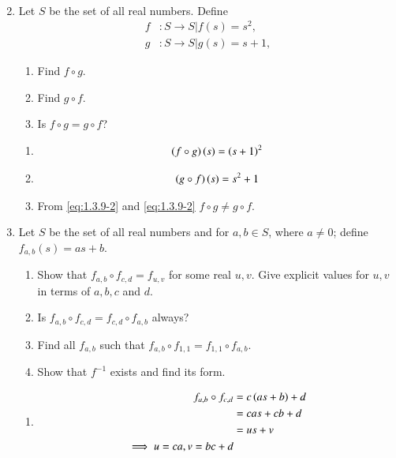 \begin{enumerate}[label=\arabic*.,ref=\thesubsection.\theenumi]
\begin{enumerate}
\begin{align}
	\end{align}
\end{enumerate}
\item Let $S$ be the set of all real numbers.  Define 
	\begin{align}
		f&:S \rightarrow S | f(s) = s^2,
		\\
		g&:S \rightarrow S | g(s) = s+1,
	\end{align}
\begin{enumerate}
	\item Find $f \circ g$.
	\item Find $g \circ f$.
	\item Is $f \circ g=g \circ f$?
\end{enumerate}
\solution 
\begin{enumerate}
	\item 
	\begin{align}
		\label{eq:1.3.9-1}
		\left(f \circ g\right)(s) = \left(s+1\right)^2
	\end{align}
	\item 
	\begin{align}
		\label{eq:1.3.9-2}
		\left(g \circ f\right)(s) = s^2+1
	\end{align}
	\item From 
		\eqref{eq:1.3.9-2}
		and
		\eqref{eq:1.3.9-2}
$f \circ g \ne g \circ f$.
\end{enumerate}
\item Let $S$ be the set of all real numbers and for $a, b \in S$, where $a \ne 0$; define $f_{a,b}(s) = as + b$.
\begin{enumerate}
	\item  Show that $f_{a,b} \circ f_{c,d} = f_{u,v}$ for some real $u, v$. Give explicit values for $u, v$ in terms of $a, b, c$ and $d$.
	\item  Is $f_{a,b} \circ f_{c,d} = f_{c,d} \circ f_{a,b}$ always?
	\item  Find all $f_{a,b}$ such that $f_{a,b} \circ f_{1,1} = f_{1,1} \circ f_{a,b}$.
	\item  Show that $f^{-1}$ exists and find its form.
\end{enumerate}
\solution 
\begin{enumerate}
	\item  
		\begin{align}
			\label{eq:1.3.10-1}
			f_{a,b} \circ f_{c,d} &= c\brak{as+b}+d
			\\
			&=cas+cb+d 
			\\
			&= us+v
			\\
			\implies u = ca, v = bc + d

\end{align}
\end{enumerate}
\end{enumerate}

